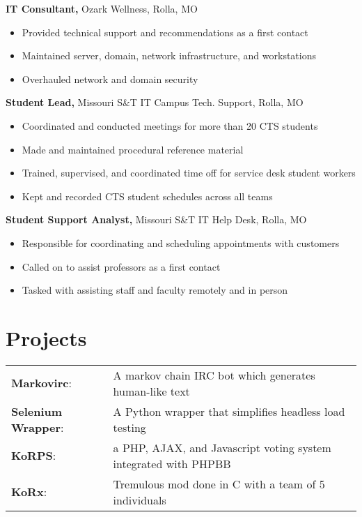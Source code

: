 \documentclass[margin]{res}
\begin{document}
\begin{resume}
     {\bf IT Consultant,} Ozark Wellness, Rolla, MO%
       \begin{itemize} \itemsep -1pt  %
         \item Provided technical support and recommendations as a first contact
         \item Maintained server, domain, network infrastructure, and workstations
         \item Overhauled network and domain security
       \end{itemize}

     {\bf Student Lead,}  Missouri S\&T IT Campus Tech. Support, Rolla, MO%
       \begin{itemize} \itemsep -1pt  %
         \item Coordinated and conducted meetings for more than 20 CTS students
         \item Made and maintained procedural reference material
         \item Trained, supervised, and coordinated time off for service desk student workers
         \item Kept and recorded CTS student schedules across all teams
       \end{itemize}
     
     {\bf Student Support Analyst,} Missouri S\&T IT Help Desk, Rolla, MO%
       \begin{itemize} \itemsep -1pt  %
         \item Responsible for coordinating and scheduling appointments with customers
         \item Called on to assist professors as a first contact
         \item Tasked with assisting staff and faculty remotely and in person
       \end{itemize}

    \section{Projects} 
      \begin{tabular}{l p{4in}}
        \textbf{Markovirc}:            & A markov chain IRC bot which generates human-like text \\ [1pt]
        \textbf{Selenium Wrapper}:     & A Python wrapper that simplifies headless load testing \\ [1pt]
        \textbf{KoRPS}:                & a PHP, AJAX, and Javascript voting system integrated with PHPBB \\ [1pt]
        \textbf{KoRx}:                 & Tremulous mod done in C with a team of 5 individuals \\ [1pt]
      \end{tabular}


\end{resume}
\end{document}
